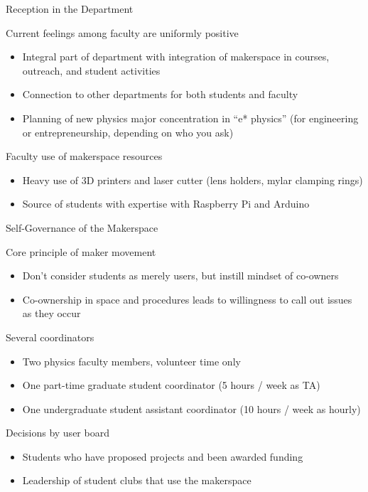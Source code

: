 \documentclass[xcolor=table,compress,professionalfonts,pdfpagelabels]{beamer}
\begin{document}
\begin{frame}{Reception in the Department}
 \begin{block}{Current feelings among faculty are uniformly positive}
  \begin{itemize}
   \item Integral part of department with integration of makerspace in courses, outreach, and student activities
   \item Connection to other departments for both students and faculty
   \item Planning of new physics major concentration in ``e* physics'' (for engineering or entrepreneurship, depending on who you ask)
  \end{itemize}
 \end{block}
 \begin{block}{Faculty use of makerspace resources}
  \begin{itemize}
   \item Heavy use of 3D printers and laser cutter (lens holders, mylar clamping rings)
   \item Source of students with expertise with Raspberry Pi and Arduino
  \end{itemize}
 \end{block}
\end{frame}

\begin{frame}{Self-Governance of the Makerspace}
 \begin{block}{Core principle of maker movement}
  \begin{itemize}
   \item Don't consider students as merely users, but instill mindset of co-owners
   \item Co-ownership in space and procedures leads to willingness to call out issues as they occur
  \end{itemize}
 \end{block}
 \begin{block}{Several coordinators}
  \begin{itemize}
   \item Two physics faculty members, volunteer time only
   \item One part-time graduate student coordinator (5 hours / week as TA)
   \item One undergraduate student assistant coordinator (10 hours / week as hourly)
  \end{itemize}
 \end{block}
 \begin{block}{Decisions by user board}
  \begin{itemize}
   \item Students who have proposed projects and been awarded funding
   \item Leadership of student clubs that use the makerspace
  \end{itemize}
 \end{block}
\end{frame}
\end{document}
